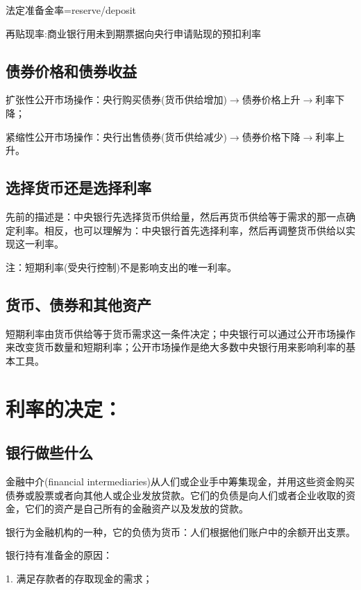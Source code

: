 \documentclass{article}
\begin{document}
法定准备金率=reserve/deposit

\hspace*{\fill}

再贴现率:商业银行用未到期票据向央行申请贴现的预扣利率

\subsection{债券价格和债券收益}
扩张性公开市场操作：央行购买债券(货币供给增加)$ \rightarrow $债券价格上升$ \rightarrow $利率下降；

紧缩性公开市场操作：央行出售债券(货币供给减少)$ \rightarrow $债券价格下降$ \rightarrow $利率上升。

\subsection{选择货币还是选择利率}
先前的描述是：中央银行先选择货币供给量，然后再货币供给等于需求的那一点确定利率。相反，也可以理解为：中央银行首先选择利率，然后再调整货币供给以实现这一利率。

注：短期利率(受央行控制)不是影响支出的唯一利率。

\subsection{货币、债券和其他资产}
短期利率由货币供给等于货币需求这一条件决定；中央银行可以通过公开市场操作来改变货币数量和短期利率；公开市场操作是绝大多数中央银行用来影响利率的基本工具。

\section{利率的决定：\uppercase\expandafter{}}

\subsection{银行做些什么}
金融中介(financial intermediaries)从人们或企业手中筹集现金，并用这些资金购买债券或股票或者向其他人或企业发放贷款。它们的负债是向人们或者企业收取的资金，它们的资产是自己所有的金融资产以及发放的贷款。

银行为金融机构的一种，它的负债为货币：人们根据他们账户中的余额开出支票。

\hspace*{\fill}

银行持有准备金的原因：

1. 满足存款者的存取现金的需求；
\end{document}
